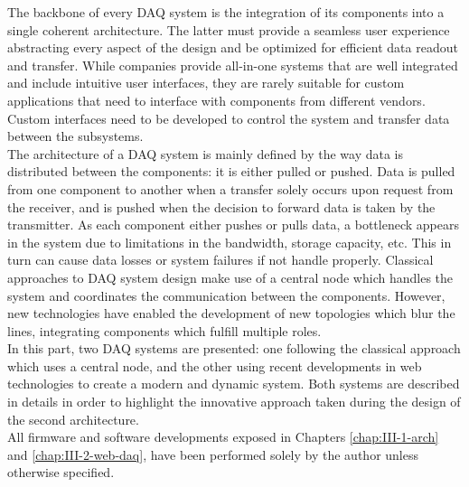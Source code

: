 The backbone of every DAQ system is the integration of its components into a single coherent architecture. The latter must provide a seamless user experience abstracting every aspect of the design and be optimized for efficient data readout and transfer. While companies provide all-in-one systems that are well integrated and include intuitive user interfaces, they are rarely suitable for custom applications that need to interface with components from different vendors. Custom interfaces need to be developed to control the system and transfer data between the subsystems. \\

The architecture of a DAQ system is mainly defined by the way data is distributed between the components: it is either pulled or pushed. Data is pulled from one component to another when a transfer solely occurs upon request from the receiver, and is pushed when the decision to forward data is taken by the transmitter. As each component either pushes or pulls data, a bottleneck appears in the system due to limitations in the bandwidth, storage capacity, etc. This in turn can cause data losses or system failures if not handle properly. Classical approaches to DAQ system design make use of a central node which handles the system and coordinates the communication between the components. However, new technologies have enabled the development of new topologies which blur the lines, integrating components which fulfill multiple roles. \\

In this part, two DAQ systems are presented: one following the classical approach which uses a central node, and the other using recent developments in web technologies to create a modern and dynamic system. Both systems are described in details in order to highlight the innovative approach taken during the design of the second architecture. \\

All firmware and software developments exposed in Chapters \ref{chap:III-1-arch} and \ref{chap:III-2-web-daq}, have been performed solely by the author unless otherwise specified.
